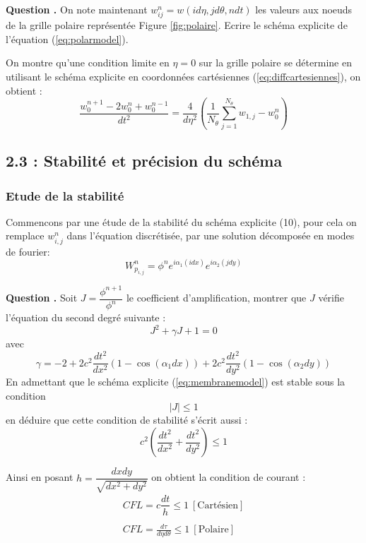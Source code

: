 \documentclass[a4,12pt]{article}
\newcounter{Nbquestion}
\newcommand*\question{%
\stepcounter{Nbquestion}%
\textbf{Question \theNbquestion. }}
\begin{document}

\question On note maintenant $w_{ij}^{n}=w(id\eta,jd\theta,ndt)$ les valeurs aux noeuds de la grille polaire représentée Figure \ref{fig:polaire}. Ecrire le schéma explicite de l'équation (\ref{eq:polarmodel}).


On montre qu'une condition limite en $\eta=0$ sur la grille polaire se détermine en utilisant le schéma explicite en coordonnées cartésiennes (\ref{eq:diffcartesiennes}), on obtient :
    \[
\dfrac{w_0^{n+1}-2 w_0^{n}+ w_{0}^{n-1}}{dt^2}=\dfrac{4}{d \eta^2}\left(\frac{1}{N_\theta} \sum_{j=1}^{N_\theta} w_{1,j}-w_{0}^{n}\right)
    \]

    \subsection*{2.3 : Stabilité et précision du schéma}

    \subsubsection{Etude de la stabilité}
    Commencons par une étude de la stabilité du schéma explicite (10), pour cela on remplace $w_{i,j}^{n}$ dans l'équation discrétisée, par une solution décomposée en modes de fourier: 
    \[
    W_{p_{i,j}}^{n}=\phi^n e^{i\alpha_1(idx)}e^{i\alpha_2(jdy)}
    \]


    \question Soit $J=\dfrac{\phi^{n+1}}{\phi^n}$ le coefficient d'amplification, montrer que $J$ vérifie l'équation du second degré suivante : 
    \[
    J^2+\gamma J+1=0
    \]
    avec 
    \[
\gamma=-2+2c^2\dfrac{dt^2}{dx^2}(1-\cos(\alpha_1dx))+2c^2\dfrac{dt^2}{dy^2}(1-\cos(\alpha_2dy))
    \]
    En admettant que le schéma explicite (\ref{eq:membranemodel}) est stable sous la condition 
    \[
    \vert J \vert \leq 1
    \]
    en déduire que cette condition de stabilité s'écrit aussi :
    \[
    c^2\left(\dfrac{dt^2}{dx^2}+\dfrac{dt^2}{dy^2}\right)\leq 1
    \]


    Ainsi en posant $\displaystyle h=\dfrac{dxdy}{\sqrt{dx^2+dy^2}}$ on obtient la condition de courant : 
    \begin{equation}
    \begin{array}{l}
    CFL=c\dfrac{dt}{h} \leq 1~[\textrm{Cartésien}] \\ \\
        \displaystyle CFL=\frac{d \tau}{d \eta d \theta}\leq 1~[\textrm{Polaire}]
        \end{array}
        \label{eq:CFL}
        \end{equation}
\end{document}
